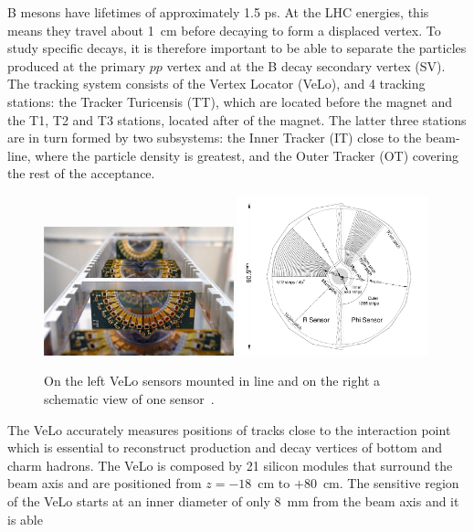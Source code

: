 B mesons have lifetimes of approximately 1.5 ps. At the LHC energies, this means they travel about
1~cm before decaying to form a displaced vertex. To study specific decays, it is therefore important
to be able to separate the particles produced at the primary $pp$ vertex and at the B decay secondary vertex (SV).
The tracking system consists of the Vertex Locator (VeLo), and 4 tracking stations:
the Tracker Turicensis (TT), which are located before the magnet and the T1, T2 and T3 stations,
located after of the magnet. The latter three stations are in turn formed by two subsystems:
the Inner Tracker (IT) close to the beam-line, where the particle density is greatest, and
the Outer Tracker (OT) covering the rest of the acceptance.
%
\begin{center}
\begin{figure}[h!]
\centering 
\includegraphics[width=0.49\textwidth]{Detector/figs/detector/VELO.png}
\includegraphics[width=0.49\textwidth]{Detector/figs/detector/VELO_scheme.png}
\caption{On the left VeLo sensors mounted in line and on the right a schematic view of one sensor~\cite{Alves:2008zz}.}
\label{VeLo}
\end{figure}
\end{center}
%
The VeLo accurately measures positions of tracks close to the interaction point which is essential to reconstruct
 production and decay vertices of bottom and charm hadrons. The VeLo is composed by 21
silicon modules that surround the beam axis and are positioned from $z = -18$~cm to $+80$~cm.
The sensitive region of the VeLo starts at an inner diameter of only 8~mm from the beam axis and it is able
